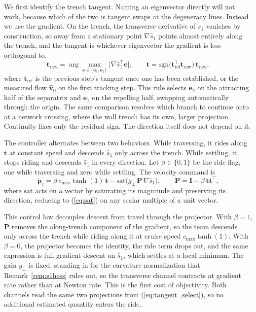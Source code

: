 \documentclass[lettersize,journal]{IEEEtran}
\begin{document}
We first identify the trench tangent. Naming an eigenvector directly will
not work, because which of the two is tangent swaps at the degeneracy
lines. Instead we use the gradient. On the trench, the transverse
derivative of $s_1$ vanishes by construction, so away from a stationary
point $\nabla\hat{s}_1$ points almost entirely along the trench, and the
tangent is whichever eigenvector the gradient is less orthogonal to.
\begin{equation}
    \mathbf{t}_{\mathrm{raw}} =
    \arg\max_{\mathbf{e} \in \{\mathbf{e}_1, \mathbf{e}_2\}}
    \bigl\lvert \nabla\hat{s}_1^\top \mathbf{e} \bigr\rvert,
    \qquad
    \mathbf{t} = \mathrm{sgn}\bigl(\mathbf{t}_{\mathrm{ref}}^\top
    \mathbf{t}_{\mathrm{raw}}\bigr)\,\mathbf{t}_{\mathrm{raw}},
    \label{eq:tangent_select}
\end{equation}
where $\mathbf{t}_{\mathrm{ref}}$ is the previous step's tangent once one
has been established, or the measured flow $\hat{\mathbf{v}}_0$ on the
first tracking step. This rule selects $\mathbf{e}_2$ on the attracting
half of the separatrix and $\mathbf{e}_1$ on the repelling half, swapping
automatically through the origin. The same comparison resolves which
branch to continue onto at a network crossing, where the wall trench has
its own, larger projection. Continuity fixes only the residual sign. The
direction itself does not depend on it.

The controller alternates between two behaviors. While traversing, it
rides along $\mathbf{t}$ at constant speed and descends $\hat{s}_1$ only
across the trench. While settling, it stops riding and descends
$\hat{s}_1$ in every direction. Let $\beta \in \{0,1\}$ be the ride flag,
one while traversing and zero while settling. The velocity command is
\begin{equation}
    \dot{\mathbf{p}}_c =
    \beta\,c_{\max}\tanh(1)\,\mathbf{t}
    - \mathrm{sat}\!\bigl(g_\perp\,\mathbf{P}\,\nabla\hat{s}_1\bigr),
    \qquad
    \mathbf{P} = \mathbf{I} - \beta\,\mathbf{t}\mathbf{t}^\top,
    \label{eq:oecs_law}
\end{equation}
where $\mathrm{sat}$ acts on a vector by saturating its magnitude and
preserving its direction, reducing to (\ref{eq:sat}) on any scalar
multiple of a unit vector.

This control law decouples descent from travel through the projector.
With $\beta = 1$, $\mathbf{P}$ removes the along-trench component of the
gradient, so the team descends only across the trench while riding along
it at cruise speed $c_{\max}\tanh(1)$. With $\beta = 0$, the projector
becomes the identity, the ride term drops out, and the same expression
is full gradient descent on $\hat{s}_1$, which settles at a local
minimum. The gain $g_\perp$ is fixed, standing in for the curvature
normalization that Remark~\ref{rem:s1hess} rules out, so the transverse
channel contracts at gradient rate rather than at Newton rate. This is
the first cost of objectivity. Both channels read the same two
projections from (\ref{eq:tangent_select}), so no additional estimated
quantity enters the ride.
\end{document}
